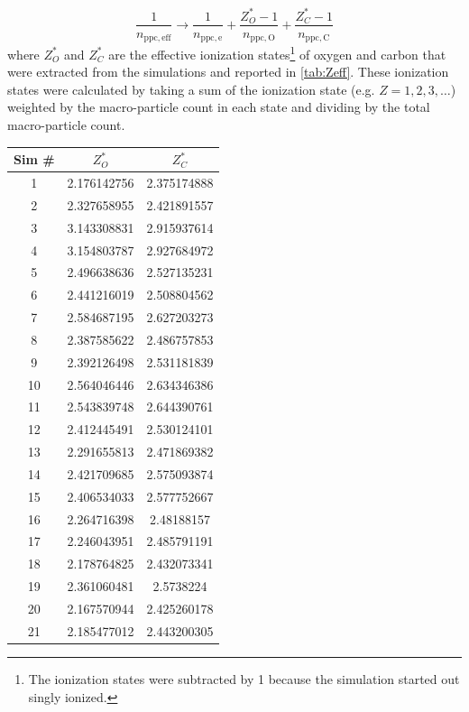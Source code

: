 \begin{equation}
	\frac{1}{n_\mathrm{ppc,eff}} \rightarrow \frac{1}{n_\mathrm{ppc,e}} + \frac{Z^*_O-1}{n_\mathrm{ ppc,O}} +\frac{Z^*_C-1}{n_\mathrm{ppc,C}}
	\label{eq:neff}
\end{equation}
where $Z_O^*$ and $Z_C^*$ are the effective ionization states\footnote{The ionization states were subtracted by 1 because the simulation started out singly ionized.} of oxygen and carbon that were extracted from the simulations and reported in \autoref{tab:Zeff}. These ionization states were calculated by taking a sum of the ionization state (e.g. $Z = {1, 2, 3, \ldots}$) weighted by the macro-particle count in each state and dividing by the total macro-particle count.

\begin{table}
	\centering
	\begin{tabular}{c|c|c}
		\hline
		Sim \# & $Z_O^*$ & $Z_C^*$ \\ \hline
		1 & 2.176142756 & 2.375174888 \\ 
		2 & 2.327658955 & 2.421891557 \\ 
		3 & 3.143308831 & 2.915937614 \\ 
		4 & 3.154803787 & 2.927684972 \\ 
		5 & 2.496638636 & 2.527135231 \\ 
		6 & 2.441216019 & 2.508804562 \\ 
		7 & 2.584687195 & 2.627203273 \\ 
		8 & 2.387585622 & 2.486757853 \\ 
		9 & 2.392126498 & 2.531181839 \\ 
		10 & 2.564046446 & 2.634346386 \\ 
		11 & 2.543839748 & 2.644390761 \\ 
		12 & 2.412445491 & 2.530124101 \\ 
		13 & 2.291655813 & 2.471869382 \\ 
		14 & 2.421709685 & 2.575093874 \\ 
		15 & 2.406534033 & 2.577752667 \\ 
		16 & 2.264716398 & 2.48188157 \\ 
		17 & 2.246043951 & 2.485791191 \\ 
		18 & 2.178764825 & 2.432073341 \\ 
		19 & 2.361060481 & 2.5738224 \\ 
		20 & 2.167570944 & 2.425260178 \\ 
		21 & 2.185477012 & 2.443200305 \\ 

\end{tabular}
\end{table}
